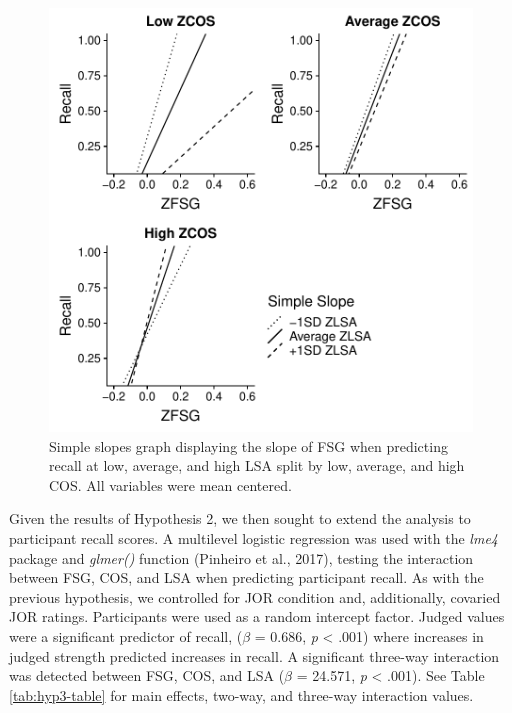 \documentclass[english,,man]{apa6}
\begin{document}
\begin{figure}[htbp]
\centering
\includegraphics{max_buch_JOL_files/figure-latex/hyp3graph-1.pdf}
\caption{\label{fig:hyp3graph}Simple slopes graph displaying the slope of
FSG when predicting recall at low, average, and high LSA split by low,
average, and high COS. All variables were mean centered.}
\end{figure}

Given the results of Hypothesis 2, we then sought to extend the analysis
to participant recall scores. A multilevel logistic regression was used
with the \emph{lme4} package and \emph{glmer()} function (Pinheiro et
al., 2017), testing the interaction between FSG, COS, and LSA when
predicting participant recall. As with the previous hypothesis, we
controlled for JOR condition and, additionally, covaried JOR ratings.
Participants were used as a random intercept factor. Judged values were
a significant predictor of recall, (\(\beta\) = 0.686, \emph{p}
\textless{} .001) where increases in judged strength predicted increases
in recall. A significant three-way interaction was detected between FSG,
COS, and LSA (\(\beta\) = 24.571, \emph{p} \textless{} .001). See Table
\ref{tab:hyp3-table} for main effects, two-way, and three-way
interaction values.
\end{document}
